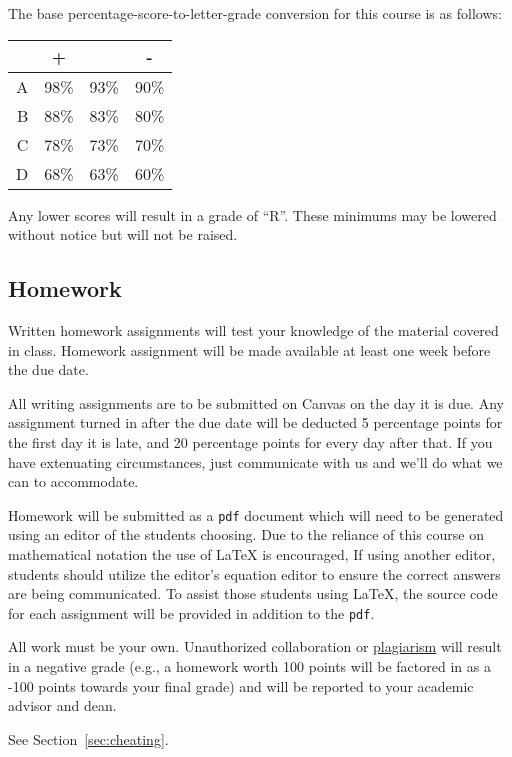 \documentclass[12pt]{scrartcl}
\begin{document}
The base percentage-score-to-letter-grade conversion for this course is as follows: 

\begin{center}
\begin{tabular}{r|ccc}
 & + & & -\\
 \hline
A & 98\% & 93\% & 90\%\\
B & 88\% & 83\% & 80\%\\
C & 78\% & 73\% & 70\%\\
D & 68\% & 63\% & 60\%\\
\end{tabular}
\end{center}
Any lower scores will result in a grade of ``R''.
These minimums may be lowered without notice but will not be raised. 

\subsection{Homework}

Written homework assignments will test your knowledge of the material covered in class. 
Homework assignment will be made available at least one week before the due date.

All writing assignments are to be submitted on Canvas on the day it is due.  
Any assignment turned in after the due date will be deducted 5 percentage points for the first day it is late, 
and 20 percentage points for every day after that.
If you have extenuating circumstances, just communicate with us and we'll do what we can to accommodate.  

Homework will be submitted as a \texttt{pdf} document which will need to be generated using an editor of the students choosing. 
Due to the reliance of this course on mathematical notation the use of \LaTeX{} is encouraged, 
If using another editor, students should utilize the editor's equation editor to ensure the correct answers are being communicated. 
To assist those students using \LaTeX, the source code for each assignment will be provided in addition to the \texttt{pdf}.

\begin{tcolorbox}[colback=red!5,colframe=red!75!black,title=Cheating policy]
All work must be your own. Unauthorized collaboration or \href{https://www.cmu.edu/student-affairs/ocsi/}{plagiarism} will result in a negative grade (e.g., a homework worth 100 points will be factored in as a -100 points towards your final grade) and will be reported to your academic advisor and dean.

\vspace{1em}
See Section~\ref{sec:cheating}.
\end{tcolorbox}
\end{document}
